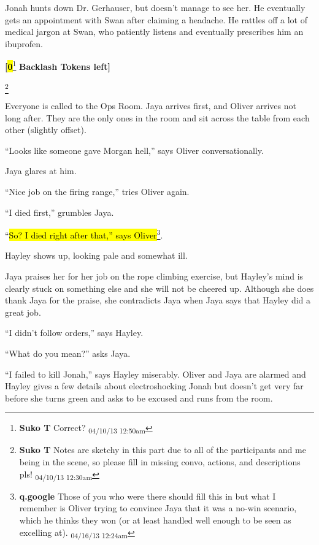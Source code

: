 Jonah hunts down Dr. Gerhauser, but doesn't manage to see her.  He eventually gets an appointment with Swan after claiming a headache.  He rattles off a lot of medical jargon at Swan, who patiently listens and eventually prescribes him an ibuprofen.



\textbf{{[}}\textbf{\hl{0}}\footnote{\textbf{Suko T }Correct? \textsubscript{04/10/13 12:50am}}\textbf{ Backlash Tokens left{]}}


\footnote{\textbf{Suko T }Notes are sketchy in this part due to all of the participants and me being in the scene, so please fill in missing convo, actions, and descriptions pls! \textsubscript{04/10/13 12:30am}}

Everyone is called to the Ops Room.  Jaya arrives first, and Oliver arrives not long after.  They are the only ones in the room and sit across the table from each other (slightly offset).

``Looks like someone gave Morgan hell,'' says Oliver conversationally.

Jaya glares at him.

``Nice job on the firing range,'' tries Oliver again.

``I died first,'' grumbles Jaya.

``\hl{So? I died right after that,'' says Oliver}\footnote{\textbf{q.google }Those of you who were there should fill this in but what I remember is Oliver trying to convince Jaya that it was a no-win scenario, which he thinks they won (or at least handled well enough to be seen as excelling at). \textsubscript{04/16/13 12:24am}}.



Hayley shows up, looking pale and somewhat ill.

Jaya praises her for her job on the rope climbing exercise, but Hayley's mind is clearly stuck on something else and she will not be cheered up.  Although she does thank Jaya for the praise, she contradicts Jaya when Jaya says that Hayley did a great job.

``I didn't follow orders,'' says Hayley.

``What do you mean?'' asks Jaya.

``I failed to kill Jonah,'' says Hayley miserably.  Oliver and Jaya are alarmed and Hayley gives a few details about electroshocking Jonah but doesn't get very far before she turns green and asks to be excused and runs from the room.



